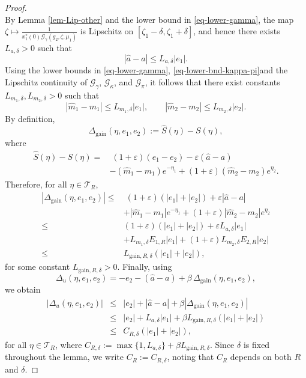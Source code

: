 \documentclass[10pt,a4paper]{amsart}
\begin{document}
\begin{proof}
\begin{equation}
\end{equation}
By Lemma \ref{lem-Lip-other} and the lower bound in \eqref{eq-lower-gamma}, the map $\zeta \mapsto \frac{1}{x_1^*(0)\mathcal{G}_\gamma(g_2,\zeta,\mu_1)}$ is Lipschitz on $[\zeta_1-\delta,\zeta_1+\delta]$, and hence there exists $L_{a,\delta}>0$ such that
\begin{equation}
|\hat a-a|\le L_{a,\delta}|e_1|.
\end{equation}
Using the lower bounds in \eqref{eq-lower-gamma}, \eqref{eq-lower-bnd-kappa-pi}and the Lipschitz continuity of $\mathcal{G}_\gamma$, $\mathcal{G}_\kappa$, and $\mathcal{G}_\pi$, it follows that there exist constants $L_{m_1,\delta},L_{m_2,\delta}>0$ such that
\begin{equation}
|\hat m_1-m_1|\le L_{m_1,\delta}|e_1|,\qquad
|\hat m_2-m_2|\le L_{m_2,\delta}|e_2|.
\end{equation}
By definition,
\begin{equation}
\Delta_{\mathrm{gain}}(\eta,e_1,e_2):= \hat S(\eta)-S(\eta),
\end{equation}
where
\begin{align}
\hat S(\eta)-S(\eta)=&\;(1+\varepsilon)(e_1-e_2)-\varepsilon(\hat a-a)\nonumber \\ &-(\hat m_1-m_1)e^{-\eta_1} +(1+\varepsilon)(\hat m_2-m_2)e^{\eta_2}.
\end{align}
Therefore, for all $\eta\in\mathcal T_{R}$,
\begin{align}
|\Delta_{\mathrm{gain}}(\eta,e_1,e_2)|
\le&\;
(1+\varepsilon)(|e_1|+|e_2|)+\varepsilon|\hat a-a|\nonumber \\ &+|\hat m_1-m_1|e^{-\eta_1}+(1+\varepsilon)|\hat m_2-m_2|e^{\eta_2} \nonumber\\
\le&
(1+\varepsilon)(|e_1|+|e_2|)+\varepsilon L_{a,\delta}|e_1|\nonumber \\ &+L_{m_1,\delta}E_{1,R}|e_1|+(1+\varepsilon)L_{m_2,\delta}E_{2,R}|e_2| \nonumber\\
\le&
L_{\mathrm{gain},R,\delta}(|e_1|+|e_2|),
\end{align}
for some constant $L_{\mathrm{gain},R,\delta}>0$. Finally, using
\begin{equation}
\Delta_u(\eta,e_1,e_2)=-e_2-(\hat a-a)+\beta\,\Delta_{\mathrm{gain}}(\eta,e_1,e_2),
\end{equation}
we obtain
\begin{eqnarray}
|\Delta_u(\eta,e_1,e_2)|
&\le&
|e_2|+|\hat a-a|+\beta|\Delta_{\mathrm{gain}}(\eta,e_1,e_2)| \nonumber\\
&\le&
|e_2|+L_{a,\delta}|e_1|+\beta L_{\mathrm{gain},R,\delta}(|e_1|+|e_2|) \nonumber\\
&\le&
C_{R,\delta}(|e_1|+|e_2|),
\end{eqnarray}
for all $\eta\in\mathcal T_R$, where $C_{R,\delta}:=\max\{1,L_{a,\delta}\}+\beta L_{\mathrm{gain},R,\delta}$. Since $\delta$ is fixed throughout the lemma, we write $C_R := C_{R,\delta}$, noting that $C_R$ depends on both $R$ and $\delta$.
\end{proof}
\end{document}
